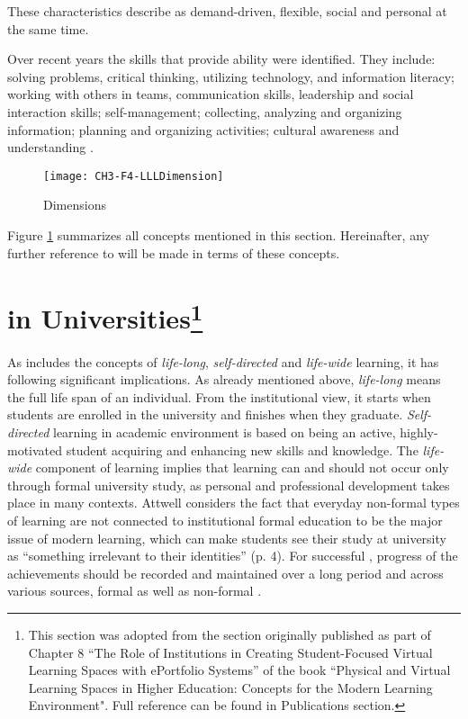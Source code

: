 These characteristics describe \LLLs as demand-driven, flexible, social and
personal at the same time. 

Over recent years the skills that provide \LLLs ability were identified. They
include: solving problems, critical thinking, utilizing technology, and
information literacy; working with others in teams, communication skills,
leadership and social interaction skills; self-management; collecting, analyzing
and organizing information; planning and organizing activities; cultural
awareness and understanding
\citep{Brooks2008,Heinrich2007,Otala1997,Pitman2009}. 

\begin{figure}[htb]
\centering
\texttt{[image: CH3-F4-LLLDimension]}
\caption{\LLLc Dimensions}
\label{fig:llldim}
\end{figure}

Figure \ref{fig:llldim} summarizes all concepts mentioned in this section.
Hereinafter, any further reference to \LLLs will be made in terms of these
concepts.

\section[\LLLc in Universities]{\LLLc in Universities\footnote{This section was
adopted from the section originally published as part of Chapter 8 ``The Role of
Institutions in Creating Student-Focused Virtual Learning Spaces with ePortfolio
Systems'' of the book ``Physical and Virtual Learning Spaces in Higher
Education: Concepts for the Modern Learning Environment". Full reference can be
found in Publications section.} }

\label{sec:uni}

As \LLLs includes the concepts of \textit{life-long}, \textit{self-directed}
and \textit{life-wide} learning, it has following significant implications. As
already mentioned above, \textit{life-long} means the full life span of an
individual. From the institutional view, it starts when students are enrolled in
the university and finishes when they graduate. \textit{Self-directed} learning
in academic environment is based on being an active, highly-motivated student
acquiring and enhancing new skills and knowledge. The \textit{life-wide}
component of learning implies that learning can and should not occur only
through formal university study, as personal and professional development takes
place in many contexts. Attwell \citeyearpar{Attwell2007} considers the fact
that everyday non-formal types of learning are not connected to institutional
formal education to be the major issue of modern learning, which can make
students see their study at university as ``something irrelevant to their
identities'' (p. 4). For successful \LLLsn, progress of the achievements should
be recorded and maintained over a long period and across various sources, formal
as well as non-formal \citep{Kay2008}.

